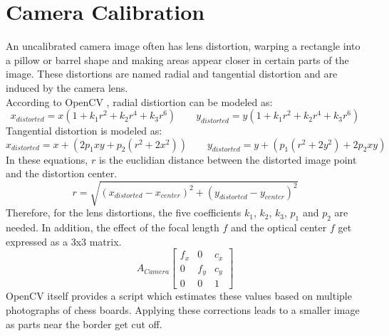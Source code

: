 \section{Camera Calibration}
An uncalibrated camera image often has lens distortion, warping a rectangle into a pillow or barrel shape and making areas appear closer in certain parts of the image. These distortions are named radial and tangential distortion and are induced by the camera lens.\\
According to OpenCV \cite{openCVCamCalib}, radial distiortion can be modeled as:
\begin{equation*}
x_{distorted} = x(1+k_{1}r^{2}+k_{2}r^{4}+k_{3}r^{6})\qquad
y_{distorted} = y(1+k_{1}r^{2}+k_{2}r^{4}+k_{3}r^{6})
\end{equation*}
Tangential distortion is modeled as\cite{openCVCamCalib}:
\begin{equation*}
    x_{distorted} = x+(2p_{1}xy+p_{2}(r^{2}+2x^{2}))\qquad
    y_{distorted} = y+(p_{1}(r^{2}+2y^{2})+2p_{2}xy)
\end{equation*}
In these equations, $r$ is the euclidian distance between the distorted image point and the distortion center.\cite{openCVCamCalib}\\
\begin{equation*}
    r=\sqrt{(x_{distorted}-x_{center})^{2}+(y_{distorted}-y_{center})^{2}}
\end{equation*}
Therefore, for the lens distortions, the five coefficients $k_{1}$, $k_{2}$, $k_{3}$, $p_{1}$ and $p_{2}$ are needed. In addition, the effect of the focal length $f$ and the optical center $f$ get expressed as a 3x3 matrix.\cite{openCVCamCalib}
\begin{equation*}
    A_{Camera}
    \begin{bmatrix}
        f_{x} & 0 & c_{x} \\
        0 & f_{y} & c_{y} \\
        0 & 0 & 1
    \end{bmatrix}
\end{equation*}
OpenCV itself provides a script which estimates these values based on multiple photographs of chess boards. Applying these corrections leads to a smaller image as parts near the border get cut off.
